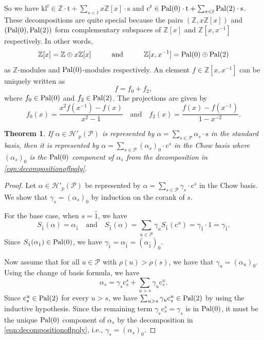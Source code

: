 \documentclass[12pt,letterpaper,english]{amsart}
\theoremstyle{teoremas}
\newtheorem{theorem}{Theorem}[section]
\theoremstyle{definition}
\newcommand{\cH}{\mathcal{H}}
\newcommand{\calP}{\mathcal{P}}
\newcommand{\ZZ}{\mathbb{Z}}
\newcommand{\Ebasis}[1]{\mathrm{#1}}
\newcommand{\Cbasis}[1]{\mathrm{c}^{#1}}
\newcommand{\CbasisSub}[2]{\mathrm{c}^{#1}_{#2}}
\newcommand{\klbasis}[1]{\mathrm{kl}^{#1}}
\newcommand{\pal}{\normalfont\text{Pal}}
\begin{document}
So we have
\(\klbasis{t}\in \ZZ\cdot \Ebasis{t} + \sum_{s<t}{x\ZZ[x]\cdot\Ebasis{s}}\) and
\(\Cbasis{t}\in \pal(0)\cdot \Ebasis{t} + \sum_{s<t}{\pal(2)\cdot\Ebasis{s}}\).
These decompositions are quite special because the pairs \((\ZZ, x\ZZ[x])\)
and \((\pal(0), \pal(2))\) form complementary subspaces of \(\ZZ[x]\) and
\(\ZZ[x,x^{-1}]\) respectively. In other words,
\[\ZZ[x] = \ZZ \oplus x\ZZ[x]\hspace{10mm}\text{and}\hspace{10mm}\ZZ[x,x^{-1}]
    = \pal(0)\oplus\pal(2)\]
as \(\ZZ\)-modules and \(\pal(0)\)-modules respectively. An element
\(f\in\ZZ[x, x^{-1}]\) can be uniquely written as
\begin{equation} \label{eqn:decompositionoflpoly}
    f = f_0 + f_2,
\end{equation}
where \(f_0\in\pal(0)\) and \(f_2\in\pal(2)\). The projections are given by
\[ f_0(x) = \frac{x^2 f(x^{-1}) - f(x)}{x^2 - 1} \quad \text{and} \quad f_2(x) = \frac{f(x) - f(x^{-1})}{1 - x^{-2}}. \]

\begin{theorem}
    \label{thm:changeofbasis}
    If \(\alpha\in\cH'_p(\calP)\) is represented by
    \(\alpha = \sum_{s\in\calP}{\alpha_s\cdot\Ebasis{s}}\) in the standard basis,
    then it is represented by
    \(\alpha = \sum_{s\in\calP}{(\alpha_s)_0}\cdot\Cbasis{s}\) in the Chow basis
    where \((\alpha_s)_0\) is the \(\pal(0)\) component of \(\alpha_s\)
    from the decomposition in \ref{eqn:decompositionoflpoly}.
\end{theorem}
\begin{proof}
    Let \(\alpha\in\cH'_p(\calP)\) be represented by
    \(\alpha = \sum_{s\in\calP}{\gamma_s\cdot\Cbasis{s}}\) in the Chow basis.
    We show that \(\gamma_s = (\alpha_s)_0\) by induction on the corank of \(s\).

    For the base case, when \(s=\hat{1}\), we have
    \[S_{\hat{1}}(\alpha) = \alpha_{\hat{1}}\quad\text{and}\quad S_{\hat{1}}(\alpha) = \sum_{u \in \calP} \gamma_u S_{\hat{1}}(\Cbasis{u})= \gamma_{\hat{1}} \cdot 1 = \gamma_{\hat{1}}.\]
    Since \(S_{\hat{1}}(\alpha_{\hat{1}})\in\pal(0)\), we have \(\gamma_{\hat{1}} = \alpha_{\hat{1}} = (\alpha_{\hat{1}})_0\).

    Now assume that for all \(u\in\calP\) with \(\rho(u) > \rho(s)\), we have that \(\gamma_u = (\alpha_u)_0\).
    Using the change of basis formula, we have
    \[\alpha_s = \gamma_s \CbasisSub{s}{s} + \sum_{u > s}{\gamma_u \CbasisSub{u}{s}}.\]
    Since \(\CbasisSub{u}{s} \in \pal(2)\) for every \(u > s\),
    we have \(\sum_{u > s}{\gamma_u \CbasisSub{u}{s}} \in \pal(2)\) by using
    the inductive hypothesis.
    Since the remaining term \(\gamma_s \CbasisSub{s}{s}= \gamma_s\) is in \(\pal(0)\),
    it must be the unique \(\pal(0)\) component of \(\alpha_s\)
    by the decomposition in \ref{eqn:decompositionoflpoly}, i.e., \(\gamma_s = (\alpha_s)_0\).
\end{proof}
\end{document}
